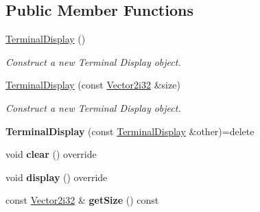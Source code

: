 \subsection*{Public Member Functions}
\begin{DoxyCompactItemize}
\item 
\mbox{\label{classmonsterbattle_1_1TerminalDisplay_a8b79db0e7bfa6b4e9da01a82caa0de49}} 
\hyperlink{classmonsterbattle_1_1TerminalDisplay_a8b79db0e7bfa6b4e9da01a82caa0de49}{Terminal\+Display} ()
\begin{DoxyCompactList}\small\item\em Construct a new Terminal Display object. \end{DoxyCompactList}\item 
\hyperlink{classmonsterbattle_1_1TerminalDisplay_aab55383157d04b355c3b6aca0abfb4a6}{Terminal\+Display} (const \hyperlink{structmonsterbattle_1_1Vector}{Vector2i32} \&size)
\begin{DoxyCompactList}\small\item\em Construct a new Terminal Display object. \end{DoxyCompactList}\item 
\mbox{\label{classmonsterbattle_1_1TerminalDisplay_af8ecfed2ed8ea68ae5d0606e3b4dbd54}} 
{\bfseries Terminal\+Display} (const \hyperlink{classmonsterbattle_1_1TerminalDisplay}{Terminal\+Display} \&other)=delete
\item 
\mbox{\label{classmonsterbattle_1_1TerminalDisplay_ad037b157a531949c3c1b0d5e0f5ca77f}} 
void {\bfseries clear} () override
\item 
\mbox{\label{classmonsterbattle_1_1TerminalDisplay_a7128ee0ace1a187bccab875ec7a06b35}} 
void {\bfseries display} () override
\item 
\mbox{\label{classmonsterbattle_1_1TerminalDisplay_aae6efb2b3ebe37bf07dcd10eb0fe34fb}} 
const \hyperlink{structmonsterbattle_1_1Vector}{Vector2i32} \& {\bfseries get\+Size} () const
\item 
\mbox{\label{classmonsterbattle_1_1TerminalDisplay_a1989fa35af5b922400f9937e0fcb7661}} 

\end{DoxyCompactItemize}

